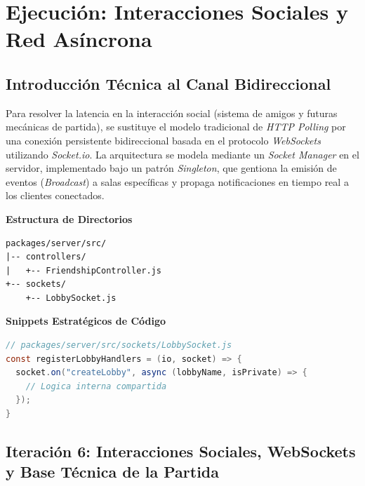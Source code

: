 \part{Ejecución: Interacciones Sociales y Red Asíncrona}

\chapter{Introducción Técnica al Canal Bidireccional}

Para resolver la latencia en la interacción social (sistema de amigos y futuras mecánicas de partida), se sustituye el modelo tradicional de \textit{HTTP Polling} por una conexión persistente bidireccional basada en el protocolo \textit{WebSockets} utilizando \textit{Socket.io}. La arquitectura se modela mediante un \textit{Socket Manager} en el servidor, implementado bajo un patrón \textit{Singleton}, que gentiona la emisión de eventos (\textit{Broadcast}) a salas específicas y propaga notificaciones en tiempo real a los clientes conectados.

\textbf{Estructura de Directorios} \\
\begin{verbatim}
packages/server/src/
|-- controllers/
|   +-- FriendshipController.js
+-- sockets/
    +-- LobbySocket.js
\end{verbatim}

\textbf{Snippets Estratégicos de Código} \\
\begin{lstlisting}[language=Java,breaklines=true]
// packages/server/src/sockets/LobbySocket.js
const registerLobbyHandlers = (io, socket) => {
  socket.on("createLobby", async (lobbyName, isPrivate) => {
    // Logica interna compartida
  });
}
\end{lstlisting}

\chapter[Iteración 6: WebSockets e Interacciones Sociales]{Iteración 6: Interacciones Sociales, WebSockets y Base Técnica de la Partida}

